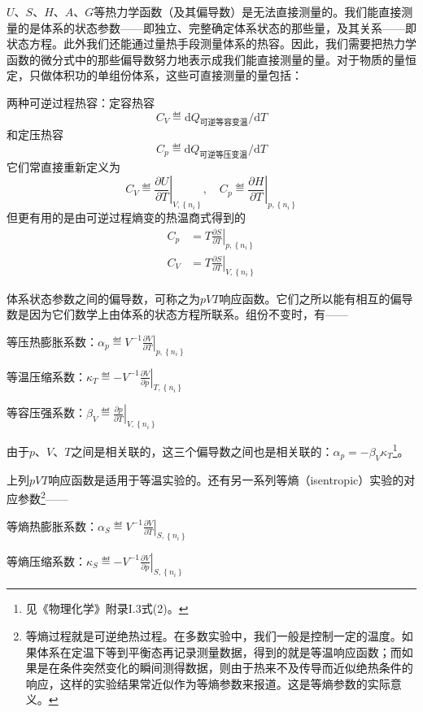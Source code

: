 \documentclass[main.tex]{subfiles}
\begin{document}
$U$、$S$、$H$、$A$、$G$等热力学函数（及其偏导数）是无法直接测量的。我们能直接测量的是体系的状态参数——即独立、完整确定体系状态的那些量，及其关系——即状态方程。此外我们还能通过量热手段测量体系的热容。因此，我们需要把热力学函数的微分式中的那些偏导数努力地表示成我们能直接测量的量。对于物质的量恒定，只做体积功的单组份体系，这些可直接测量的量包括：

两种可逆过程热容：定容热容
\[C_V\eqdef\mathrm{d} Q_\text{可逆等容变温}/\mathrm{d}T\]
和定压热容
\[C_p\eqdef\mathrm{d} Q_\text{可逆等压变温}/\mathrm{d}T\]
它们常直接重新定义为
\[C_V\eqdef\left.\frac{\partial U}{\partial T}\right|_{V,\left\{n_i\right\}},\quad C_p\eqdef\left.\frac{\partial H}{\partial T}\right|_{p,\left\{n_i\right\}}\]
但更有用的是由可逆过程熵变的热温商式得到的
\begin{align}
    C_p & =T\left.\frac{\partial S}{\partial T}\right|_{p,\left\{n_i\right\}}\label{eq:I.1_heat_capacity_entropy_p} \\
    C_V & =T\left.\frac{\partial S}{\partial T}\right|_{V,\left\{n_i\right\}}\label{eq:I.1_heat_capacity_entropy_V}
\end{align}

体系状态参数之间的偏导数，可称之为$pVT$响应函数。它们之所以能有相互的偏导数是因为它们数学上由体系的状态方程所联系。组份不变时，有——

等压热膨胀系数：$\alpha_p\eqdef V^{-1}\left.\frac{\partial V}{\partial T}\right|_{p,\left\{n_i\right\}}$

等温压缩系数：$\kappa_T\eqdef-V^{-1}\left.\frac{\partial V}{\partial p}\right|_{T,\left\{n_i\right\}}$

等容压强系数：$\beta_V\eqdef\left.\frac{\partial p}{\partial T}\right|_{V,\left\{n_i\right\}}$

由于$p$、$V$、$T$之间是相关联的，这三个偏导数之间也是相关联的：$\alpha_p=-\beta_V\kappa_T$\footnote{见《物理化学》附录I.3式(2)。}。

上列$pVT$响应函数是适用于等温实验的。还有另一系列等熵（isentropic）实验的对应参数\footnote{等熵过程就是可逆绝热过程。在多数实验中，我们一般是控制一定的温度。如果体系在定温下等到平衡态再记录测量数据，得到的就是等温响应函数；而如果是在条件突然变化的瞬间测得数据，则由于热来不及传导而近似绝热条件的响应，这样的实验结果常近似作为等熵参数来报道。这是等熵参数的实际意义。}——

等熵热膨胀系数：$\alpha_S\eqdef V^{-1}\left.\frac{\partial V}{\partial T}\right|_{S,\left\{n_i\right\}}$

等熵压缩系数：$\kappa_S\eqdef -V^{-1}\left.\frac{\partial V}{\partial p}\right|_{S,\left\{n_i\right\}}$
\end{document}
